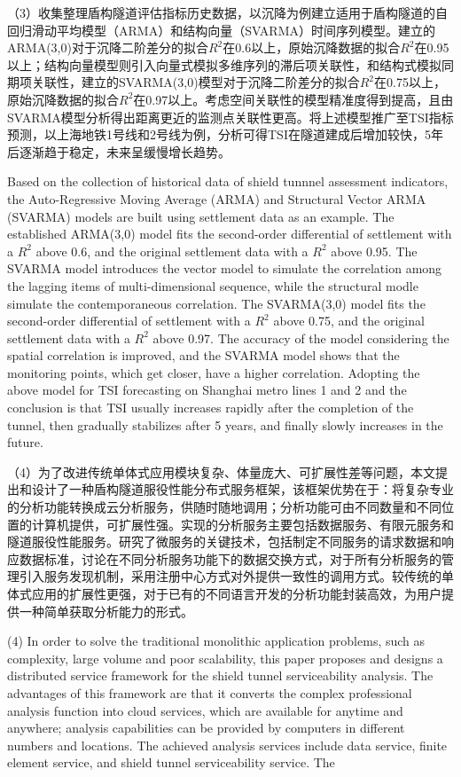\begin{cabstract}
（3）收集整理盾构隧道评估指标历史数据，以沉降为例建立适用于盾构隧道的自回归滑动平均模型（ARMA）和结构向量（SVARMA）时间序列模型。建立的ARMA(3,0)对于沉降二阶差分的拟合$R^2$在0.6以上，原始沉降数据的拟合$R^2$在0.95以上；结构向量模型则引入向量式模拟多维序列的滞后项关联性，和结构式模拟同期项关联性，建立的SVARMA(3,0)模型对于沉降二阶差分的拟合$R^2$在0.75以上，原始沉降数据的拟合$R^2$在0.97以上。考虑空间关联性的模型精准度得到提高，且由SVARMA模型分析得出距离更近的监测点关联性更高。将上述模型推广至TSI指标预测，以上海地铁1号线和2号线为例，分析可得TSI在隧道建成后增加较快，5年后逐渐趋于稳定，未来呈缓慢增长趋势。

Based on the collection of historical data of shield tunnnel assessment indicators, the Auto-Regressive Moving Average (ARMA) and Structural Vector ARMA (SVARMA) models are built using settlement data as an example. The established ARMA(3,0) model fits the second-order differential of settlement with a $R^2$ above 0.6, and the original settlement data with a $R^2$ above 0.95. The SVARMA model introduces the vector model to simulate the correlation among the lagging items of multi-dimensional sequence, while the structural modle simulate the contemporaneous correlation. The SVARMA(3,0) model fits the second-order differential of settlement with a $R^2$ above 0.75, and the original settlement data with a $R^2$ above 0.97. The accuracy of the model considering the spatial correlation is improved, and the SVARMA model shows that the monitoring points, which get closer, have a higher correlation. Adopting the above model for TSI forecasting on Shanghai metro lines 1 and 2 and the conclusion is that TSI usually increases rapidly after the completion of the tunnel, then gradually stabilizes after 5 years, and finally slowly increases in the future.

（4）为了改进传统单体式应用模块复杂、体量庞大、可扩展性差等问题，本文提出和设计了一种盾构隧道服役性能分布式服务框架，该框架优势在于：将复杂专业的分析功能转换成云分析服务，供随时随地调用；分析功能可由不同数量和不同位置的计算机提供，可扩展性强。实现的分析服务主要包括数据服务、有限元服务和隧道服役性能服务。研究了微服务的关键技术，包括制定不同服务的请求数据和响应数据标准，讨论在不同分析服务功能下的数据交换方式，对于所有分析服务的管理引入服务发现机制，采用注册中心方式对外提供一致性的调用方式。较传统的单体式应用的扩展性更强，对于已有的不同语言开发的分析功能封装高效，为用户提供一种简单获取分析能力的形式。

(4) In order to solve the traditional monolithic application problems, such as complexity, large volume and poor scalability, this paper proposes and designs a distributed service framework for the shield tunnel serviceability analysis. The advantages of this framework are that it converts the complex professional analysis function into cloud services, which are available for anytime and anywhere; analysis capabilities can be provided by computers in different numbers and locations. The achieved analysis services include data service, finite element service, and shield tunnel serviceability service. The 


\end{cabstract}
